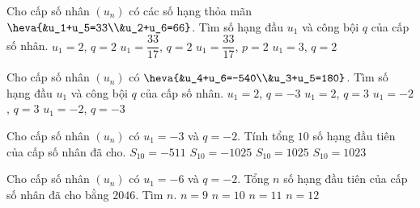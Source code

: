 \begin{ex}%
    Cho cấp số nhân $(u_n)$ có các số hạng thỏa mãn $\heva{&u_1+u_5=33\\&u_2+u_6=66}$. Tìm số hạng đầu $u_1$ và công bội $q$ của cấp số nhân.
    \choice
    {$u_1=2$, $q=2$}
    {\True $u_1=\dfrac{33}{17}$, $q=2$}
    {$u_1=\dfrac{33}{17}$, $p=2$}
    {$u_1=3$, $q=2$}
\end{ex}
\begin{ex}%
    Cho cấp số nhân $(u_n)$ có $\heva{&u_4+u_6=-540\\&u_3+u_5=180}$. Tìm số hạng đầu $u_1$ và công bội $q$ của cấp số nhân.
    \choice
    {\True $u_1=2$, $q=-3$}
    {$u_1=2$, $q=3$}
    {$u_1=-2$, $q=3$}
    {$u_1=-2$, $q=-3$}
\end{ex}
\begin{ex}%
    Cho cấp số nhân $(u_n)$ có $u_1=-3$ và $q=-2$. Tính tổng $10$ số hạng đầu tiên của cấp số nhân đã cho.
    \choice
    {$S_{10}=-511$}
    {$S_{10}=-1025$}
    {$S_{10}=1025$}
    {\True $S_{10}=1023$}
\end{ex}
\begin{ex}%
    Cho cấp số nhân $(u_n)$ có $u_1=-6$ và $q=-2$. Tổng $n$ số hạng đầu tiên của cấp số nhân đã cho bằng $2046$. Tìm $n$. 
    \choice
    {$n=9$}
    {\True $n=10$}
    {$n=11$}
    {$n=12$}
\end{ex}
